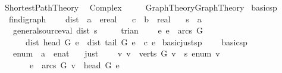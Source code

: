 %
\begin{isabellebody}%
\def\isabellecontext{Shortest{\isacharunderscore}Path{\isacharunderscore}Theory}%
%
\isadelimtheory
%
\endisadelimtheory
%
\isatagtheory
{}\isamarkupfalse%
\ Shortest{\isacharunderscore}Path{\isacharunderscore}Theory\isanewline
{}\isanewline
\ \ Complex\ \ \ \isanewline
\ \ {\isachardoublequoteopen}{\isachardot}{\isachardot}{\isacharslash}Graph{\isacharunderscore}Theory{\isacharslash}Graph{\isacharunderscore}Theory{\isachardoublequoteclose}\isanewline
{}%
\endisatagtheory
{\isafoldtheory}%
%
\isadelimtheory
\isanewline
%
\endisadelimtheory
\isanewline
\isanewline
{}\isamarkupfalse%
\ basic{\isacharunderscore}sp\ {\isacharequal}\ \isanewline
\ \ fin{\isacharunderscore}digraph\ {\isacharplus}\isanewline
\ \ \ dist\ {\isacharcolon}{\isacharcolon}\ {\isachardoublequoteopen}{\isacharprime}a\ {\isasymRightarrow}\ ereal{\isachardoublequoteclose}\isanewline
\ \ \ c\ {\isacharcolon}{\isacharcolon}\ {\isachardoublequoteopen}{\isacharprime}b\ {\isasymRightarrow}\ real{\isachardoublequoteclose}\isanewline
\ \ \ s\ {\isacharcolon}{\isacharcolon}\ {\isachardoublequoteopen}{\isacharprime}a{\isachardoublequoteclose}\isanewline
\ \ \ general{\isacharunderscore}source{\isacharunderscore}val{\isacharcolon}\ {\isachardoublequoteopen}dist\ s\ {\isasymle}\ {}{\isachardoublequoteclose}\isanewline
\ \ \ trian{\isacharcolon}\isanewline
\ \ \ \ {\isachardoublequoteopen}{\isasymAnd}e{\isachardot}\ e\ {\isasymin}\ arcs\ G\ {\isasymLongrightarrow}\ \isanewline
\ \ \ \ \ \ dist\ {\isacharparenleft}head\ G\ e{\isacharparenright}\ {\isasymle}\ dist\ {\isacharparenleft}tail\ G\ e{\isacharparenright}\ {\isacharplus}\ c\ e{\isachardoublequoteclose}\isanewline
\isanewline
{}\isamarkupfalse%
\ basic{\isacharunderscore}just{\isacharunderscore}sp\ {\isacharequal}\ \isanewline
\ \ basic{\isacharunderscore}sp\ {\isacharplus}\isanewline
\ \ \ enum\ {\isacharcolon}{\isacharcolon}\ {\isachardoublequoteopen}{\isacharprime}a\ {\isasymRightarrow}\ enat{\isachardoublequoteclose}\isanewline
\ \ \ just{\isacharcolon}\isanewline
\ \ \ \ {\isachardoublequoteopen}{\isasymAnd}v{\isachardot}\ {\isasymlbrakk}v\ {\isasymin}\ verts\ G{\isacharsemicolon}\ v\ {\isasymnoteq}\ s{\isacharsemicolon}\ enum\ v\ {\isasymnoteq}\ {\isasyminfinity}{\isasymrbrakk}\ {\isasymLongrightarrow}\isanewline
\ \ \ \ \ \ {\isasymexists}\ e\ {\isasymin}\ arcs\ G{\isachardot}\ v\ {\isacharequal}\ head\ G\ e\ {\isasymand}\isanewline

\end{isabellebody}
